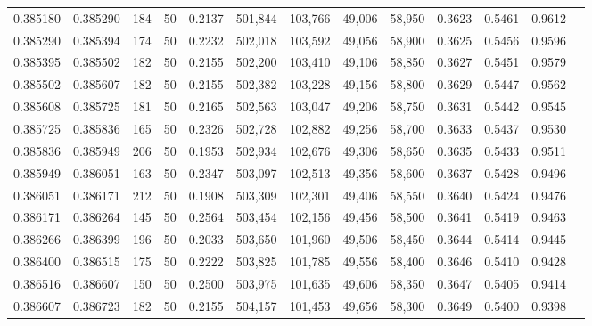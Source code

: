 \begin{tabular}{rrrrrrrrrrrrr}
0.385180 & 0.385290 &   184 &  50 &                                     0.2137 & 501,844 & 103,766 &  49,006 &  58,950 & 0.3623 & 0.5461 & 0.9612 \\
0.385290 & 0.385394 &   174 &  50 &                                     0.2232 & 502,018 & 103,592 &  49,056 &  58,900 & 0.3625 & 0.5456 & 0.9596 \\
0.385395 & 0.385502 &   182 &  50 &                                     0.2155 & 502,200 & 103,410 &  49,106 &  58,850 & 0.3627 & 0.5451 & 0.9579 \\
0.385502 & 0.385607 &   182 &  50 &                                     0.2155 & 502,382 & 103,228 &  49,156 &  58,800 & 0.3629 & 0.5447 & 0.9562 \\
0.385608 & 0.385725 &   181 &  50 &                                     0.2165 & 502,563 & 103,047 &  49,206 &  58,750 & 0.3631 & 0.5442 & 0.9545 \\
0.385725 & 0.385836 &   165 &  50 &                                     0.2326 & 502,728 & 102,882 &  49,256 &  58,700 & 0.3633 & 0.5437 & 0.9530 \\
0.385836 & 0.385949 &   206 &  50 &                                     0.1953 & 502,934 & 102,676 &  49,306 &  58,650 & 0.3635 & 0.5433 & 0.9511 \\
0.385949 & 0.386051 &   163 &  50 &                                     0.2347 & 503,097 & 102,513 &  49,356 &  58,600 & 0.3637 & 0.5428 & 0.9496 \\
0.386051 & 0.386171 &   212 &  50 &                                     0.1908 & 503,309 & 102,301 &  49,406 &  58,550 & 0.3640 & 0.5424 & 0.9476 \\
0.386171 & 0.386264 &   145 &  50 &                                     0.2564 & 503,454 & 102,156 &  49,456 &  58,500 & 0.3641 & 0.5419 & 0.9463 \\
0.386266 & 0.386399 &   196 &  50 &                                     0.2033 & 503,650 & 101,960 &  49,506 &  58,450 & 0.3644 & 0.5414 & 0.9445 \\
0.386400 & 0.386515 &   175 &  50 &                                     0.2222 & 503,825 & 101,785 &  49,556 &  58,400 & 0.3646 & 0.5410 & 0.9428 \\
0.386516 & 0.386607 &   150 &  50 &                                     0.2500 & 503,975 & 101,635 &  49,606 &  58,350 & 0.3647 & 0.5405 & 0.9414 \\
0.386607 & 0.386723 &   182 &  50 &                                     0.2155 & 504,157 & 101,453 &  49,656 &  58,300 & 0.3649 & 0.5400 & 0.9398 \\

\end{tabular}
